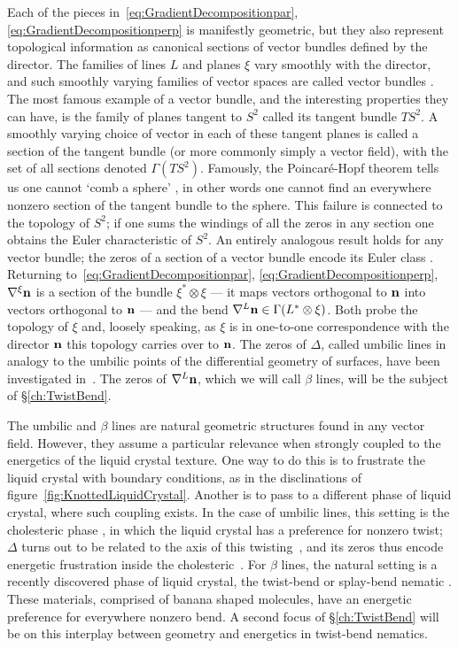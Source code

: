 Each of the pieces in~\eqref{eq:GradientDecompositionpar}, \eqref{eq:GradientDecompositionperp} is manifestly geometric, but they also represent topological information as canonical sections of vector bundles defined by the director. The families of lines $L$ and planes $\xi$ vary smoothly with the director, and such smoothly varying families of vector spaces are called vector bundles \citep{TuBook,MilnorStasheffBook}. The most famous example of a vector bundle, and the interesting properties they can have, is the family of planes tangent to $S^2$ called its tangent bundle $T S^2$. A smoothly varying choice of vector in each of these tangent planes is called a section of the tangent bundle (or more commonly simply a vector field), with the set of all sections denoted $\Gamma (TS^2)$. Famously, the Poincar\'e-Hopf theorem tells us one cannot `comb a sphere' \citep{Milnor1997}, in other words one cannot find an everywhere nonzero section of the tangent bundle to the sphere. This failure is connected to the topology of $S^2$; if one sums the windings of all the zeros in any section one obtains the Euler characteristic of $S^2$. An entirely analogous result holds for any vector bundle; the zeros of a section of a vector bundle encode its Euler class \citep{BottTuBook, MilnorStasheffBook}. Returning to~\eqref{eq:GradientDecompositionpar}, \eqref{eq:GradientDecompositionperp}, $\nabla^\xi \bf n $ is a section of the bundle $\xi^* \otimes \xi$ --- it maps vectors orthogonal to $\bf n$ into vectors orthogonal to $\bf n$ --- and the bend $\nabla^L {\bf n} \in \Gamma (L^* \otimes \xi)$. Both probe the topology of $\xi$ and, loosely speaking, as $\xi$ is in one-to-one correspondence with the director $\bf n$ this topology carries over to $\bf n$. The zeros of $\Delta$, called umbilic lines in analogy to the umbilic points of the differential geometry of surfaces, have been investigated in~\citep{Machon2016b}. The zeros of $\nabla^L \bf n$, which we will call $\beta$ lines, will be the subject of \S\ref{ch:TwistBend}.

The umbilic and $\beta$ lines are natural geometric structures found in any vector field. However, they assume a particular relevance when strongly coupled to the energetics of the liquid crystal texture. One way to do this is to frustrate the liquid crystal with boundary conditions, as in the disclinations of figure~\ref{fig:KnottedLiquidCrystal}. Another is to pass to a different phase of liquid crystal, where such coupling exists. In the case of umbilic lines, this setting is the cholesteric phase \citep{Bellar2014}, in which the liquid crystal has a preference for nonzero twist; $\Delta$ turns out to be related to the axis of this twisting~\citep{MachonThesis, AlexanderBook}, and its zeros thus encode energetic frustration inside the cholesteric~\citep{Machon2016b}. For $\beta$ lines, the natural setting is a recently discovered phase of liquid crystal, the twist-bend or splay-bend nematic \citep{Cestari2011,Chen2013,Borshch2013,Lavrentovich2018}. These materials, comprised of banana shaped molecules, have an energetic preference for everywhere nonzero bend. A second focus of \S\ref{ch:TwistBend} will be on this interplay between geometry and energetics in twist-bend nematics. 

